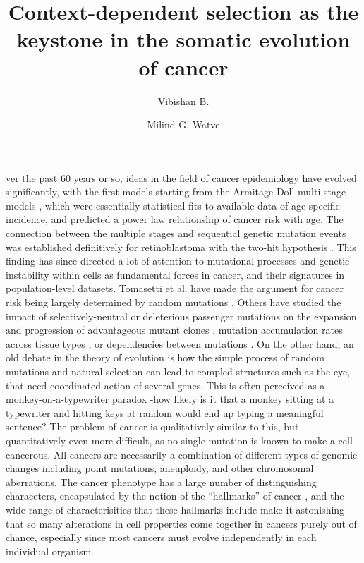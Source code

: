 \documentclass[9pt,twocolumn,twoside]{pnas-new}
\title{Context-dependent selection as the keystone in the somatic evolution of cancer}
\author[1,2]{Vibishan B.}
\author[1,2,*]{Milind G. Watve}
\affil[1]{Department of Biology, Indian Institute of Science Education and Research (IISER), Pune}
\begin{document}
\maketitle
\thispagestyle{firststyle}

ver the past 60 years or so, ideas in the field of cancer epidemiology have evolved significantly, with the first models starting from the Armitage-Doll multi-stage models \cite{ARMITAGE1954}, which were essentially statistical fits to available data of age-specific incidence, and predicted a power law relationship of cancer risk with age. The connection between the multiple stages and sequential genetic mutation events was established definitively for retinoblastoma with the two-hit hypothesis \cite{Knudson1971}. This finding has since directed a lot of attention to mutational processes and genetic instability within cells as fundamental forces in cancer, and their signatures in population-level datasets. Tomasetti et al. have made the argument for cancer risk being largely determined by random mutations \cite{Tomasetti78, Tomasetti2017}. Others have studied the impact of selectively-neutral or deleterious passenger mutations on the expansion and progression of advantageous mutant clones \cite{McFarland2013}, mutation accumulation rates across tissue types \cite{Blokzijl2016}, or dependencies between mutations \cite{Mina2017}. On the other hand, an old debate in the theory of evolution is how the simple process of random mutations and natural selection can lead to compled structures such as the eye, that need coordinated action of several genes. This is often perceived as a monkey-on-a-typewriter paradox \cite{Dawkins1996}-how likely is it that a monkey sitting at a typewriter and hitting keys at random would end up typing a meaningful sentence? The problem of cancer is qualitatively similar to this, but quantitatively even more difficult, as no single mutation is known to make a cell cancerous. All cancers are necessarily a combination of different types of genomic changes including point mutations, aneuploidy, and other chromosomal aberrations. The cancer phenotype has a large number of distinguishing characeters, encapsulated by the notion of the ``hallmarks'' of cancer \cite{Hanahan2000, Schafer2008, Hanahan2011}, and the wide range of characterisitics that these hallmarks include make it astonishing that so many alterations in cell properties come together in cancers purely out of chance, especially since most cancers must evolve independently in each individual organism.
\end{document}
